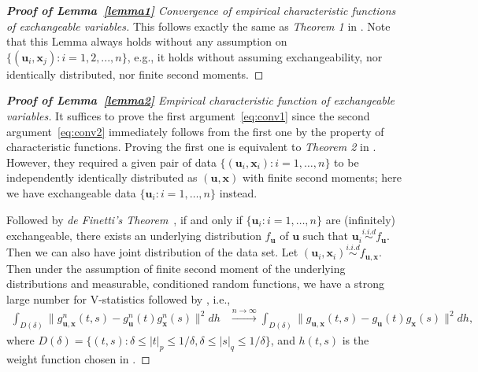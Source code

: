 \documentclass[11pt]{article}
\theoremstyle{definition}
\begin{document}
\begin{proof}[\textbf{Proof of Lemma~\ref{lemma1}} Convergence of empirical characteristic functions of exchangeable variables] 
	This follows exactly the same as \textit{Theorem 1} in \cite{szekely2007measuring}. Note that this Lemma always holds without any assumption on $\{(\mathbf{u}_{i},\mathbf{x}_{j}) :  i=1,2,...,n\}$, e.g., it holds without assuming exchangeability, nor identically distributed, nor finite second moments.
\end{proof}

\begin{proof}[\textbf{Proof of Lemma~\ref{lemma2}} Empirical characteristic function of exchangeable variables] 
	\bigskip	
	It suffices to prove the first argument~\ref{eq:conv1} since the second argument~\ref{eq:conv2} immediately follows from the first one by the property of characteristic functions.
	Proving the first one is equivalent to \textit{Theorem 2} in \cite{szekely2007measuring}. However, they required a given pair of data $\{(\mathbf{u}_{i},\mathbf{x}_{i}) : i = 1, \ldots , n \}$ to be independently identically distributed as $(\mathbf{u},\mathbf{x})$ with finite second moments; here we have exchangeable data $\{  \mathbf{u}_{i} : i = 1, \ldots, n  \}$ instead. 
	
	Followed by \textit{de Finetti's Theorem}~\cite{diaconis1980finite}, if and only if $\{ \mathbf{u}_{i} : i = 1, \ldots, n \}$ are (infinitely) exchangeable, there exists an underlying distribution $f_{\mathbf{u}}$ of $\mathbf{u}$ such that $\mathbf{u}_{i}  \overset{i.i.d}{\sim} f_{\mathbf{u}} $. Then we can also have joint distribution of the data set. Let $(\mathbf{u}_{i}, \mathbf{x}_{i}) \overset{i.i.d}{\sim}   f_{\mathbf{u}, \mathbf{x}}$. Then under the assumption of finite second moment of the underlying distributions and measurable, conditioned random functions, we have a strong large number for V-statistics followed by \cite{szekely2007measuring}, i.e., 
	\begin{eqnarray}
	\displaystyle\int_{D(\delta)}{\|g_{\mathbf{u},\mathbf{x}}^{n}(t,s)-g_{\mathbf{u}}^{n}(t)g_{\mathbf{x}}^{n}(s)\|^{2}}dh &\stackrel{n \rightarrow \infty}{\longrightarrow} 
	\displaystyle\int_{D(\delta)}{\|g_{\mathbf{u},\mathbf{x}}(t,s)-g_{\mathbf{u}}(t)g_{\mathbf{x}}(s)\|^{2}}dh,
	\label{eq:SLLN}
	\end{eqnarray}
	where $D(\delta)=\{(t,s):\delta \leq |t|_{p} \leq 1/\delta,\delta \leq |s|_{q} \leq 1/\delta\}$, and $h(t,s)$ is the weight function chosen in \cite{szekely2007measuring}. 
\end{proof}
\end{document}
